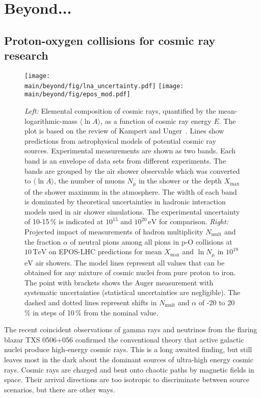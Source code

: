 \documentclass[../report.tex]{subfiles}
\providecommand{\main}{..}
\newcommand{\mlna}{\langle \ln\!A \rangle}
\newcommand{\nmu}{N_\mu}
\newcommand{\lnnmu}{\ln\!\nmu}
\newcommand{\xmax}{X_\text{max}}
\newcommand{\nmult}{N_\text{mult}}
\newcommand{\si}[1]{\ensuremath{\text{#1}}}
\newcommand{\SI}[2]{\ensuremath{#1\,\si{#2}}}
\begin{document}
\section{Beyond...}

\subsection{Proton-oxygen collisions for cosmic ray research}

\begin{figure}
\texttt{[image: \\main/beyond/fig/lna\_uncertainty.pdf]}
\texttt{[image: \\main/beyond/fig/epos\_mod.pdf]}
\caption{\emph{Left:} Elemental composition of cosmic rays, quantified by the mean-logarithmic-mass $\mlna$, as a function of cosmic ray energy $E$. The plot is based on the review of Kampert and Unger~\cite{kampert_cr_review}. Lines show predictions from astrophysical models of potential cosmic ray sources. Experimental measurements are shown as two bands. Each band is an envelope of data sets from different experiments. The bands are grouped by the air shower observable which was converted to $\mlna$, the number of muons $\nmu$ in the shower or the depth $\xmax$ of the shower maximum in the atmosphere. The width of each band is dominated by theoretical uncertainties in hadronic interaction models used in air shower simulations. The experimental uncertainty of 10-15\,\% is indicated at $10^{15}$ and $10^{20}$\,\si{eV} for comparison. \emph{Right:} Projected impact of measurements of hadron multiplicity $\nmult$ and the fraction $\alpha$ of neutral pions among all pions in p-O collisions at \SI{10}{TeV} on EPOS-LHC predictions for mean $\xmax$ and $\lnnmu$ in $10^{19}$\,\si{eV} air showers. The model lines represent all values that can be obtained for any mixture of cosmic nuclei from pure proton to iron. The point with brackets shows the Auger measurement with systematic uncertainties (statistical uncertainties are negligible). The dashed and dotted lines represent shifts in $\nmult$ and $\alpha$ of -20 to 20\,\% in steps of 10\,\% from the nominal value.}
\label{fig:cosmic_rays}
\end{figure}

The recent coincident observations of gamma rays and neutrinos from the flaring blazar TXS 0506+056 confirmed the conventional theory that active galactic nuclei produce high-energy cosmic rays\cite{IceCube:2018dnn}. This is a long awaited finding, but still leaves most in the dark about the dominant sources of ultra-high energy cosmic rays. Cosmic rays are charged and bent onto chaotic paths by magnetic fields in space. Their arrival directions are too isotropic to discriminate between source scenarios, but there are other ways.
\end{document}
